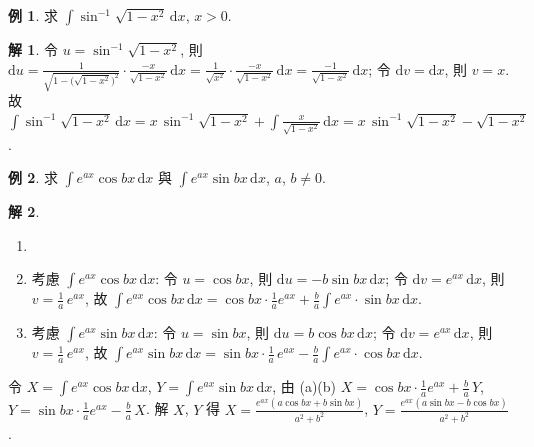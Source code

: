 \documentclass[12pt]{extarticle}
\newcommand{\ds}{\displaystyle}
\theoremstyle{definition}
\newtheorem*{ex}{例}
\newtheorem*{sol}{解}
\begin{document}
\begin{ex}
  求 $\ds\int\!\sin^{-1}\!\sqrt{1 - x^2}\,\text{d}x$, $x > 0$. 
\end{ex}

\begin{sol}
  令 $\ds u = \sin^{-1}\!\sqrt{1 - x^2}$, 則 $\ds\text{d}u = \frac{1}{\sqrt{1 - \big(\sqrt{1 - x^2}\big)^2}}\cdot\frac{-x}{\sqrt{1 - x^2}}\,\text{d}x = \frac{1}{\sqrt{x^2}}\cdot\frac{-x}{\sqrt{1 - x^2}}\,\text{d}x = \frac{-1}{\sqrt{1 - x^2}}\,\text{d}x$; 令 $\ds\text{d}v = \text{d}x$, 則 $\ds v = x$. 故 $\ds\int\!\sin^{-1}\!\sqrt{1 - x^2}\,\text{d}x = x\,\sin^{-1}\!\sqrt{1 - x^2} + \int\!\frac{x}{\sqrt{1 - x^2}}\,\text{d}x = x\,\sin^{-1}\!\sqrt{1 - x^2} - \sqrt{1 - x^2}$. 
\end{sol}

\begin{ex}
  求 $\ds\int\!e^{ax}\cos bx\,\text{d}x$ 與 $\ds\int\!e^{ax}\sin bx\,\text{d}x$, $a$, $b\ne 0$. 
\end{ex}

\begin{sol}
  \begin{enumerate}[label=(\alph*)]\setlength{\itemsep}{0pt}
    \item[]
    \item 考慮 $\ds\int\!e^{ax}\cos bx\,\text{d}x$: 令 $\ds u = \cos bx$, 則 $\ds\text{d}u = -b\sin bx\,\text{d}x$; 令 $\ds\text{d}v = e^{ax}\,\text{d}x$, 則 $\ds v = \frac{1}{a}\,e^{ax}$, 故 $\ds\int\!e^{ax}\cos bx\,\text{d}x = \cos bx\cdot \frac{1}{a}e^{ax} + \frac{b}{a}\int\!e^{ax}\cdot\sin bx\,\text{d}x$. 
    \item 考慮 $\ds\int\!e^{ax}\sin bx\,\text{d}x$: 令 $\ds u = \sin bx$, 則 $\ds\text{d}u = b\cos bx\,\text{d}x$; 令 $\ds\text{d}v = e^{ax}\,\text{d}x$, 則 $\ds v = \frac{1}{a}\,e^{ax}$, 故 $\ds\int\!e^{ax}\sin bx\,\text{d}x = \sin bx\cdot \frac{1}{a}\,e^{ax} - \frac{b}{a}\int\!e^{ax}\cdot\cos bx\,\text{d}x$. 
  \end{enumerate}
  \noindent 令 $\ds X = \int\!e^{ax}\cos bx\,\text{d}x$, $\ds Y = \int\!e^{ax}\sin bx\,\text{d}x$, 由 (a)(b) $\ds X = \cos bx\cdot\frac{1}{a}e^{ax} + \frac{b}{a}\,Y$, $\ds Y = \sin bx\cdot\frac{1}{a}e^{ax} - \frac{b}{a}\,X$. 解 $X$, $Y$ 得 $\ds X = \frac{e^{ax}(a\cos bx + b\sin bx)}{a^2 + b^2}$, $\ds Y = \frac{e^{ax}(a\sin bx - b\cos bx)}{a^2 + b^2}$. 
\end{sol}
\end{document}
